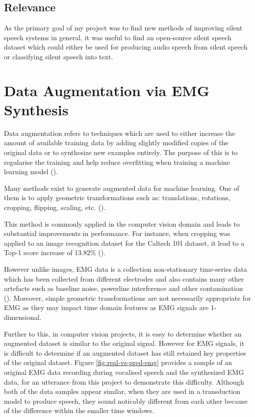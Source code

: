 \subsection{Relevance}

As the primary goal of my project was to find new methods of improving silent
speech systems in general, it was useful to find an open-source silent speech
dataset which could either be used for producing audio speech from silent
speech or classifying silent speech into text.

\section{Data Augmentation via EMG Synthesis}

Data augmentation refers to techniques which are used to either increase
the amount of available training data by adding slightly modified
copies of the original data or to synthesize new examples entirely.
The purpose of this is to regularise the training and help reduce overfitting
when training a machine learning model (\cite{data_augmentation_def}).

Many methods exist to generate augmented data for machine learning.
One of them is to apply geometric transformations such as: translations, rotations,
cropping, flipping, scaling, etc. (\cite{data_augmentation_def}).

This method is commonly applied in the computer vision domain and
leads to substantial improvements in performance. For instance,
when cropping was applied to an image recognition dataset for the
Caltech 101 dataset, it lead to a Top-1 score increase of 13.82\%
(\cite{geometric_augment}).

However unlike images, EMG data is a collection non-stationary
time-series data which has been collected from different electrodes
and also contains many other artefacts such as baseline noise,
powerline interference and other contamination (\cite{semg_filtering}).
Moreover, simple geometric transformations are not necessarily appropriate
for EMG as they may impact time domain features as EMG signals are
1-dimensional.

Further to this, in computer vision projects, it is easy to determine whether
an augmented dataset is similar to the original signal. However for EMG
signals, it is difficult to determine if an augmented dataset has still
retained key properties of the original dataset.
Figure \ref{fig:real-vs-pred-emg} provides a sample of an original
EMG data recording during vocalised speech and the synthesized EMG
data, for an utterance from this project to demonstrate this difficulty.
Although both of the data samples appear similar, when they are used in
a transduction model to produce speech, they sound noticably different from
each other because of the difference within the smaller time windows.

